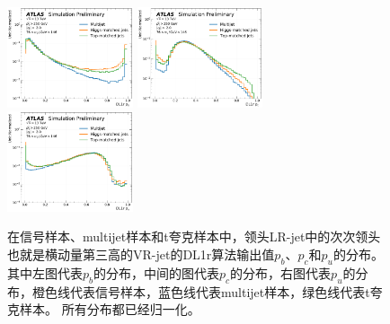 \begin{figure}[h]
    \includegraphics[width=0.33\textwidth]{figuresXbb/samples/inputs_aux/dl1r_pb_3_norm.pdf}
    \includegraphics[width=0.33\textwidth]{figuresXbb/samples/inputs_aux/dl1r_pc_3_norm.pdf}
    \includegraphics[width=0.33\textwidth]{figuresXbb/samples/inputs_aux/dl1r_pu_3_norm.pdf}
  \caption{在信号样本、multijet样本和t夸克样本中，领头LR-jet中的次次领头也就是横动量第三高的VR-jet的DL1r算法输出值$p_b$、$p_c$和$p_u$的分布。
其中左图代表$p_b$的分布，中间的图代表$p_c$的分布，右图代表$p_u$的分布，橙色线代表信号样本，蓝色线代表multijet样本，绿色线代表t夸克样本。
所有分布都已经归一化。}
\label{fig:DL1RLLLD}
\end{figure}


